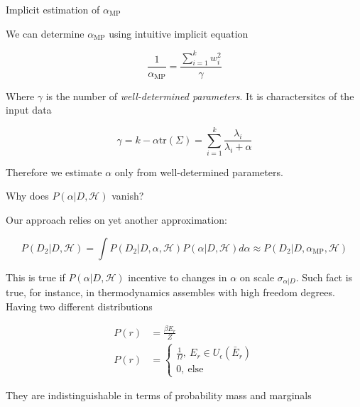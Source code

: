 \documentclass[10pt]{beamer}
\theoremstyle{definition}
\begin{document}
	\begin{frame}{Implicit estimation of $ \alpha_{\text{MP}} $}
	
		We can determine $ \alpha_{\text{MP}} $ using intuitive implicit equation
		
		\begin{equation}\label{eq:implied Ev}
			\frac{1}{\alpha_{\text{MP}}} = \frac{\sum\limits_{i = 1}^k w_i^2}{\gamma}
		\end{equation}
		
		Where $ \gamma $ is the number of \textit{well-determined parameters}. It is charactersitcs of the input data
		
		\begin{equation*}
			\gamma = k - \alpha \text{tr}(\Sigma) = \sum\limits_{i = 1}^k \frac{\lambda_i}{\lambda_i + \alpha}
		\end{equation*}
		
		Therefore we estimate $ \alpha $ only from well-determined parameters.
		
	\end{frame}
	
	\begin{frame}{Why does $ P(\alpha | D, \mathcal{H}) $ vanish?}
		
		Our approach relies on yet another approximation:
		
		\begin{equation*}
			P(D_2 | D, \mathcal{H}) = \int P(D_2 | D, \alpha, \mathcal{H}) P(\alpha | D, \mathcal{H}) d\alpha \approx P(D_2 | D,  \alpha_{\text{MP}}, \mathcal{H})
		\end{equation*}
		
		This is true if $ P(\alpha | D, \mathcal{H}) $ incentive to changes in $ \alpha $ on scale $ \sigma_{\alpha | D} $. Such fact is true, for instance, in thermodynamics assembles  with high freedom degrees. Having two different distributions 
		
		\begin{align*}
			P(r) &= \frac{\beta E_r}{Z} \\
			P(r) &= \begin{cases*}
				\frac{1}{\Omega}, \ E_r \in U_{\epsilon}(\bar{E}_r) \\
				0, \ \text{else}
			\end{cases*}
		\end{align*}
		
		They are indistinguishable in terms of probability mass and marginals
		
	\end{frame}
	
\end{document}
